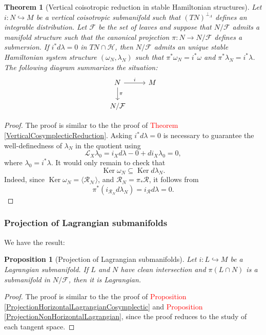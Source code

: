 \documentclass[12pt]{article}
\newtheorem{prop}{Proposition}[section]
\newtheorem{theorem}{Theorem}[section]
\renewcommand{\ker}{\operatorname{Ker}}
\begin{document}
\begin{theorem}[Vertical coisotropic reduction in stable Hamiltonian structures] Let $i: N \hookrightarrow M$ be a vertical coisotropic submanifold such that $(TN)^{\perp_\Lambda}$ defines an integrable distribution. Let $\mathcal{F}$ be the set of leaves and suppose that $N/\mathcal{F}$ admits a manifold structure such that the canonical projection $\pi: N \rightarrow N/\mathcal{F}$ defines a submersion. If $i^* d\lambda = 0$ in $TN \cap \mathcal{H}$, then $N/\mathcal{F}$ admits an unique stable Hamiltonian system structure $(\omega_N, \lambda_N)$ such that $\pi^*\omega_N = i^*\omega$ and $\pi^*\lambda_N = i^*\lambda$. The following diagram summarizes the situation:
 \[
\begin{tikzcd} N \arrow[r, "i"] \arrow[d, "\pi"] & M \\ N / \mathcal{F} \end{tikzcd} \]
\end{theorem}
\begin{proof} The proof is similar to the the proof of \textcolor{red}{ Theorem \ref{VerticalCosymplecticReduction}}. Asking $i^*d\lambda = 0$ is necessary to guarantee the well-definedness of $\lambda_N$ in the quotient using $$\mathcal{L}_X \lambda_0 = i_Xd\lambda-0 + di_X\lambda_0 = 0,$$ where $\lambda_0 = i^*\lambda$. It would only remain to check that $$\ker \omega_N \subseteq \ker d\lambda_N.$$ Indeed, since $\ker \omega_N = \langle \mathcal{\mathcal{R}_N} \rangle$, and $\mathcal{R}_N = \pi_* \mathcal{R}$, it follows from $$\pi^*(i_{\mathcal{R}_N}d\lambda_N) = i_\mathcal{R} d\lambda =  0.$$
\end{proof} 


\subsubsection{Projection of Lagrangian submanifolds}
We have the result:\\
\begin{prop}[Projection of Lagrangian submanifolds] Let $i: L \hookrightarrow M$ be a Lagrangian submanifold. If $L$ and $N$ have clean intersection and $\pi(L \cap N)$ is a submanifold in $N /\mathcal{F}$, then it is Lagrangian.
\end{prop}
\begin{proof} The proof is similar to the the proof of \textcolor{red}{Proposition \ref{ProjectionHorizontalLagrangianCosymplectic}} and \textcolor{red}{Proposition \ref{ProjectionNonHorizontalLagrangian}}, since the proof reduces to the study of each tangent space.
\end{proof}
\end{document}
